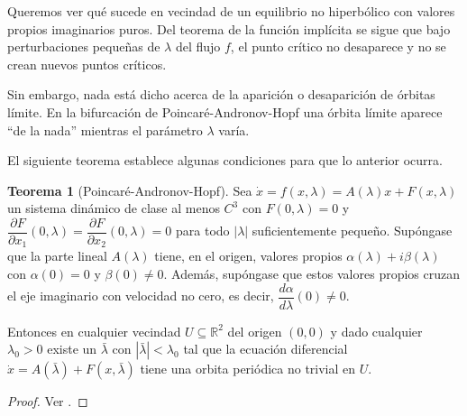 \documentclass[11pt]{book}
\theoremstyle{definition}
\numberwithin{definition}{section}
\theoremstyle{theorem}
\newtheorem{theorem}{Teorema}
\numberwithin{theorem}{section}
\numberwithin{lemma}{section}
\numberwithin{corollary}{section}
\theoremstyle{plain}
\numberwithin{example}{section}
\newcommand{\R}{{\ensuremath{\mathbb{R}}}}
\begin{document}
Queremos ver qué sucede en vecindad de un equilibrio no hiperbólico con valores propios imaginarios puros. Del teorema de la función implícita se sigue que bajo perturbaciones pequeñas de $\lambda$ del flujo $f$, el punto crítico no desaparece y no se crean nuevos puntos críticos.

Sin embargo, nada está dicho acerca de la aparición o desaparición de órbitas límite. En la bifurcación de Poincaré-Andronov-Hopf una órbita límite aparece ``de la nada'' mientras el parámetro $\lambda$ varía.

El siguiente teorema establece algunas condiciones para que lo anterior ocurra.

\begin{theorem}[Poincaré-Andronov-Hopf] \label{teo:poincare-andronov-hopf} Sea $\dot{x} = f(x,\lambda) = A(\lambda)x + F(x,\lambda)$ un sistema dinámico de clase al menos $C^3$ con $F(0,\lambda) = 0$ y $\dfrac{\partial F}{\partial x_1}(0, \lambda) = \dfrac{\partial F}{\partial x_2}(0, \lambda) = 0$ para todo $|\lambda|$ suficientemente pequeño. Supóngase que la parte lineal $A(\lambda)$ tiene, en el origen, valores propios $\alpha(\lambda) + i\beta(\lambda)$ con $\alpha(0) = 0$ y $\beta(0) \neq 0$.
Además, supóngase que estos valores propios cruzan el eje imaginario con velocidad no cero, es decir, $\dfrac{d\alpha}{d\lambda}(0) \neq 0$.

Entonces en cualquier vecindad $U \subseteq \R^2$ del origen $(0,0)$ y dado cualquier $\lambda_0 > 0$ existe un $\bar{\lambda}$ con $|\bar{\lambda}| < \lambda_0$ tal que la ecuación diferencial $\dot{x} = A(\bar{\lambda}) + F(x, \bar{\lambda})$ tiene una orbita periódica no trivial en $U$.
\begin{proof}
Ver \cite[p.~344]{dynandbif}.
\end{proof}
\end{theorem}
\end{document}
